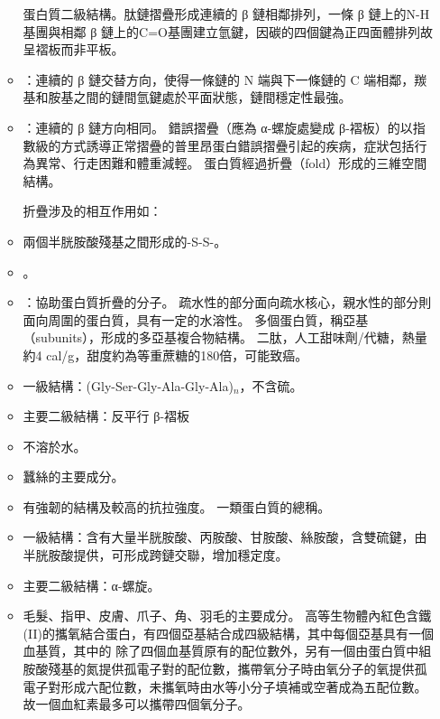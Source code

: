 \documentclass[a4paper,12pt]{report}
\begin{document}
\begin{itemize}
\begin{itemize}
\eit
\eit
{}
蛋白質二級結構。肽鏈摺疊形成連續的 β 鏈相鄰排列，一條 β 鏈上的N-H基團與相鄰 β 鏈上的C=O基團建立氫鍵，因碳的四個鍵為正四面體排列故呈褶板而非平板。
\bit
\item {}：連續的 β 鏈交替方向，使得一條鏈的 N 端與下一條鏈的 C 端相鄰，羰基和胺基之間的鏈間氫鍵處於平面狀態，鏈間穩定性最強。
\item {}：連續的 β 鏈方向相同。
\eit
{}
錯誤摺疊（應為 α-螺旋處變成 β-褶板）的以指數級的方式誘導正常摺疊的普里昂蛋白錯誤摺疊引起的疾病，症狀包括行為異常、行走困難和體重減輕。
蛋白質經過折疊（fold）形成的三維空間結構。

折疊涉及的相互作用如：
\bit
\item 兩個半胱胺酸殘基之間形成的-S-S-。
\item {}。
\item {}：協助蛋白質折疊的分子。
\eit
{}
疏水性的部分面向疏水核心，親水性的部分則面向周圍的蛋白質，具有一定的水溶性。
多個蛋白質，稱亞基（subunits），形成的多亞基複合物結構。
二肽，人工甜味劑/代糖，熱量約4 cal/g，甜度約為等重蔗糖的180倍，可能致癌。
\bit
\item 一級結構：(Gly-Ser-Gly-Ala-Gly-Ala)$_n$，不含硫。
\item 主要二級結構：反平行 β-褶板
\item 不溶於水。
\item 蠶絲的主要成分。
\item 有強韌的結構及較高的抗拉強度。
\eit
{}
一類蛋白質的總稱。
\bit
\item 一級結構：含有大量半胱胺酸、丙胺酸、甘胺酸、絲胺酸，含雙硫鍵，由半胱胺酸提供，可形成跨鏈交聯，增加穩定度。
\item 主要二級結構：α-螺旋。
\item 毛髮、指甲、皮膚、爪子、角、羽毛的主要成分。
\eit
{}
高等生物體內紅色含鐵(II)的攜氧結合蛋白，有四個亞基結合成四級結構，其中每個亞基具有一個血基質，其中的  除了四個血基質原有的配位數外，另有一個由蛋白質中組胺酸殘基的氮提供孤電子對的配位數，攜帶氧分子時由氧分子的氧提供孤電子對形成六配位數，未攜氧時由水等小分子填補或空著成為五配位數。故一個血紅素最多可以攜帶四個氧分子。


\end{itemize}
\end{itemize}
\end{document}
